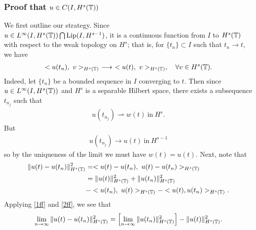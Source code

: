 \subsubsection{Proof that $u \in C(I, H^s(\mathbb{T}))$} 
We first outline our strategy. Since \\
$u \in L^\infty(I, H^s(\mathbb{T})) \bigcap \text{Lip}(I, H^{s-1})$, it is a
continuous function from $I$ to $H^s(\mathbb{T})$ with respect to the weak
topology on $H^{s}$; that is, for $\{t_n\} \subset I$ such that $t_n \to t$, we
have
\begin{equation}
\begin{split}
<u(t_n), \ v>_{H^s(\mathbb{T})} \ \longrightarrow \
<u(t), \ v>_{H^s(\mathbb{T})}, \quad \forall
v \in H^s(\mathbb{T}).
\label{1ff}
\end{split}
\end{equation}
Indeed, let $\{t_{n}\}$ be a bounded sequence in $I$ converging to $t$. Then
since $u \in L^\infty(I, H^s(\mathbb{T}))$ and $H^{s}$ is a separable Hilbert space,
there exists a subsequence $t_{n_{j}}$ such that
%
%
\begin{equation*}
\begin{split}
    u(t_{n_{j}}) \rightharpoonup w(t)  \ \text{in} \ H^{s}.
\end{split}
\end{equation*}
%
%
But
\begin{equation*}
\begin{split}
    u(t_{n_{j}}) \to u(t)  \ \text{in} \ H^{s-1}
\end{split}
\end{equation*}
so by the uniqueness of the limit we must have
$w(t) = u(t)$. Next, note that
\begin{equation}
\begin{split}
\|u(t) - u(t_n) \|_{H^s(\mathbb{T})}^2
& = <u(t) - u(t_n), \ u(t) -
u(t_n)>_{H^s(\mathbb{T})}
\\
& = \|u(t)\|_{H^s(\mathbb{T})}^2 + \|u(t_n)\|_{H^s(\mathbb{T})}^2
\\
& - <u(t_n), \
u(t) >_{H^s(\mathbb{T})} - <u(t), u(t_n)>_{H^s(\mathbb{T})}.
\label{2ff}
\end{split}
\end{equation}
Applying \eqref{1ff} and \eqref{2ff}, we see that
\begin{equation}
\begin{split}
\lim_{n \to \infty} \|u(t) - u(t_n)\|_{H^s(\mathbb{T})}^2 = \left[ \lim_{n
\to \infty} \|u(t_n)\|_{H^s(\mathbb{T})}^2
\right] - \|u(t)\|_{H^s(\mathbb{T})}^2.
\label{3ff}
\end{split}
\end{equation}
